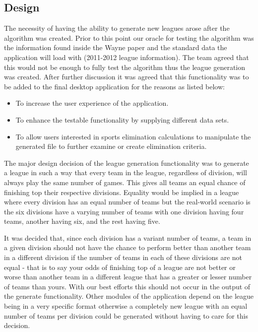 \subsection{Design}
The necessity of having the ability to generate new leagues arose
after the algorithm was created. Prior to this point our oracle for
testing the algorithm was the information found inside the Wayne paper
\cite{Wayne} and the standard data the application will load with
(2011-2012 league information). The team agreed that this would not be
enough to fully test the algorithm thus the league generation was
created. After further discussion it was agreed that this
functionality was to be added to the final desktop application for the
reasons as listed below:

\begin{itemize}
\item To increase the user experience of the application.
\item To enhance the testable functionality by supplying different data
sets.
\item To allow users interested in sports elimination calculations to
manipulate the generated file to further examine or create
elimination criteria.
\end{itemize}

The major design decision of the league generation functionality was to
generate a league in such a way that every team in the league,
regardless of division, will always play the same number of games. This
gives all teams an equal chance of finishing top their respective
divisions. Equality would be implied in a league where every division has
an equal number of teams but the real-world scenario is the six divisions
have a varying number of teams with one division having four teams, another
having six, and the rest having five.

It was decided that, since each division has a variant number of teams, a
team in a given division should not have the chance to perform better than
another team in a different division if the number of teams in each of
these divisions are not equal - that is to say your odds of finishing
top of a league are not better or worse than another team in a
different league that has a greater or lesser number of teams than
yours. With our best efforts this should not occur in the output of
the generate functionality. Other modules of the application depend on
the league being in a very specific format otherwise a completely new
league with an equal number of teams per division could be generated
without having to care for this decision.

